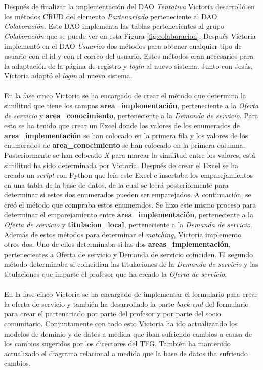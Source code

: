 \documentclass[11pt]{book}
\begin{document}
	Después de finalizar la implementación del DAO \textit{Tentativa} Victoria desarrolló en los métodos CRUD del elemento \textit{Partenariado} perteneciente al DAO \textit{Colaboración}. Este DAO implementa las tablas pertenecientes al grupo \textit{Colaboración} que se puede ver en esta Figura \ref{fig:colaboracion}.
	Después Victoria implementó en el DAO \textit{Usuarios} dos métodos para obtener cualquier tipo de usuario con el id y con el correo del usuario. Estos métodos eran necesarios para la adaptación de la página de registro y \textit{login} al nuevo sistema. Junto con Jesús, Victoria adaptó el \textit{login} al nuevo sistema.\\\\
	En la fase cinco Victoria se ha encargado de crear el método que determina la similitud que tiene los campos \textbf{area\_implementación}, perteneciente a la \textit{Oferta de servicio} y \textbf{area\_conocimiento}, perteneciente a la \textit{Demanda de servicio}. Para esto se ha tenido que crear un Excel donde los valores de los enumerados de \textbf{area\_implementación} se han colocado en la primera fila y los valores de los enumerados de  \textbf{area\_conocimiento} se han colocado en la primera columna. Posteriormente se han colocado \textit{X} para marcar la similitud entre los valores, está similitud ha sido determinada por Victoria. Después de crear el Excel se ha creado un \textit{script} con Python que leía este Excel e insertaba los emparejamientos en una tabla de la base de datos, de la cual se leerá posteriormente para determinar si estos dos enumerados pueden ser emparejados. A continuación, se creó el método que compraba estos enumerados. Se hizo este mismo proceso para determinar el emparejamiento entre \textbf{area\_implementación}, perteneciente a la \textit{Oferta de servicio} y \textbf{titulacion\_local}, perteneciente a la \textit{Demanda de servicio}.\\
	Además de estos métodos para determinar el \textit{matching}, Victoria implemento otros dos. Uno de ellos determinaba si las dos \textbf{areas\_implementación}, pertenecientes a Oferta de servicio y Demanda de servicio coinciden. El segundo método determinaba si coincidían las titulaciones de la \textit{Demanda de servicio} y las titulaciones que imparte el profesor que ha creado la \textit{Oferta de servicio}.\\\\
	En la fase cinco Victoria se ha encargado de implementar el formulario para crear la oferta de servicio y también ha desarrollado la parte \textit{back-end} del formulario para crear el partenariado por parte del profesor y por parte del socio comunitario.
	Conjuntamente con todo esto Victoria ha ido actualizando los modelos de dominio y de datos a medida que iban sufriendo cambios a causa de los cambios sugeridos por los directores del TFG. También ha mantenido actualizado el diagrama relacional a medida que la base de datos iba sufriendo cambios.
\newpage
\end{document}
